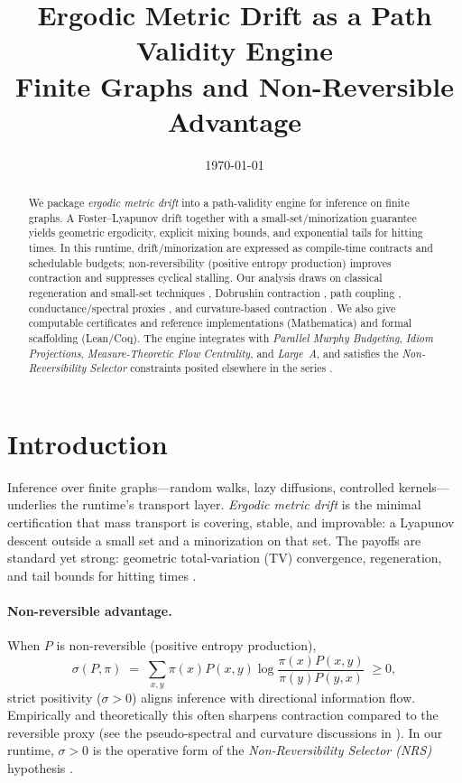 \documentclass[11pt]{article}
\title{\textbf{Ergodic Metric Drift as a Path Validity Engine}\\[0.25em]\large Finite Graphs and Non-Reversible Advantage}
\author{}
\date{\today}
\theoremstyle{plain}
\theoremstyle{definition}
\theoremstyle{remark}
\newcommand{\1}{\mathds{1}}
\newcommand{\EP}{\sigma}
\begin{document}
\maketitle

\begin{abstract}
We package \emph{ergodic metric drift} into a path-validity engine for inference on finite graphs. A Foster--Lyapunov drift together with a small-set/minorization guarantee yields geometric ergodicity, explicit mixing bounds, and exponential tails for hitting times. In this runtime, drift/minorization are expressed as compile-time contracts and schedulable budgets; non-reversibility (positive entropy production) improves contraction and suppresses cyclical stalling. Our analysis draws on classical regeneration and small-set techniques \cite{MeynTweedie2009,Nummelin1984,RobertsRosenthal2004}, Dobrushin contraction \cite{Seneta2006,LevinPeresWilmer2009}, path coupling \cite{BubleyDyer1997}, conductance/spectral proxies \cite{LevinPeresWilmer2009}, and curvature-based contraction \cite{Ollivier2009,JoulinOllivier2010}. We also give computable certificates and reference implementations (Mathematica) and formal scaffolding (Lean/Coq). The engine integrates with \emph{Parallel Murphy Budgeting}, \emph{Idiom Projections}, \emph{Measure-Theoretic Flow Centrality}, and \emph{Large~A}, and satisfies the \emph{Non-Reversibility Selector} constraints posited elsewhere in the series \cite{MurphyBudget2025,IdiomProjections2025,FlowCentrality2025,GradedEffects2025,NRSinPrep2025,QFI2025}.
\end{abstract}

\section{Introduction}
Inference over finite graphs---random walks, lazy diffusions, controlled kernels---underlies the runtime's transport layer. \emph{Ergodic metric drift} is the minimal certification that mass transport is covering, stable, and improvable: a Lyapunov descent outside a small set and a minorization on that set. The payoffs are standard yet strong: geometric total-variation (TV) convergence, regeneration, and tail bounds for hitting times \cite{MeynTweedie2009,RobertsRosenthal2004,Nummelin1984}.

\paragraph{Non-reversible advantage.}
When $P$ is non-reversible (positive entropy production),
\[
\EP(P,\pi)\;=\;\sum_{x,y}\pi(x)P(x,y)\log\frac{\pi(x)P(x,y)}{\pi(y)P(y,x)}\;\ge 0,
\]
strict positivity ($\EP>0$) aligns inference with directional information flow. Empirically and theoretically this often sharpens contraction compared to the reversible proxy (see the pseudo-spectral and curvature discussions in \cite{LevinPeresWilmer2009,Ollivier2009,JoulinOllivier2010}). In our runtime, $\EP>0$ is the operative form of the \emph{Non-Reversibility Selector (NRS)} hypothesis \cite{NRSinPrep2025}.
\end{document}
